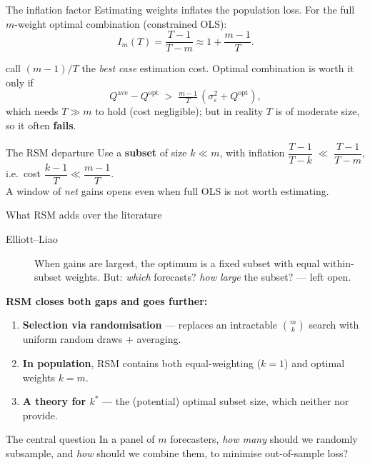 \documentclass[11pt,aspectratio=169]{beamer}
\newcommand{\Qopt}{Q^{\mathrm{opt}}}
\newcommand{\Qave}{Q^{\mathrm{ave}}}
\begin{document}
\begin{frame}{The inflation factor}
  Estimating weights inflates the population loss. For the full
  $m$-weight optimal combination (constrained OLS):
  \[
    I_m(T)=\frac{T-1}{T-m}\approx 1+\frac{m-1}{T}.
  \]

  \citet*{ElliottLiao2025} call $(m-1)/T$ the \emph{best case} estimation
  cost. Optimal combination is worth it only if
  \[
    \Qave-\Qopt \;>\; \tfrac{m-1}{T}\,(\sigma_\varepsilon^2+\Qopt),
  \]
  which needs $T\gg m$ to hold (cost negligible); but in reality $T$ is of
  moderate size, so it often \textbf{fails}.

  \begin{alertblock}{The RSM departure}
    Use a \textbf{subset} of size $k\ll m$, with inflation
    $\dfrac{T-1}{T-k}\;\ll\;\dfrac{T-1}{T-m}$,\qquad
    i.e.\ cost $\dfrac{k-1}{T}\ll\dfrac{m-1}{T}$.
    \\[2pt]
    A window of \emph{net} gains opens even when full OLS is not worth estimating.
  \end{alertblock}
\end{frame}

\begin{frame}{What RSM adds over the literature}
  \begin{description}
    \item[Elliott--Liao ] When gains are largest, the optimum is a fixed
      subset with equal within-subset weights. But: \emph{which} forecasts?
      \emph{how large} the subset? --- left open.
  \end{description}
  \textbf{RSM closes both gaps and goes further:}
  \begin{enumerate}
    \item \textbf{Selection via randomisation} --- replaces an intractable
      $\binom{m}{k}$ search with uniform random draws + averaging.
      \item \textbf{In population}, RSM contains both equal-weighting ($k=1$) and optimal weights $k=m$.
    \item \textbf{A theory for $k^*$} --- the (potential) optimal subset size, which
      neither \citet*{ElliottLiao2025} nor \citet*{ChenMaung2023} provide.
  \end{enumerate}
  \begin{block}{The central question}
    In a panel of $m$ forecasters, \emph{how many} should we randomly
    subsample, and \emph{how} should we combine them, to minimise
    out-of-sample loss?
  \end{block}
\end{frame}
\end{document}
